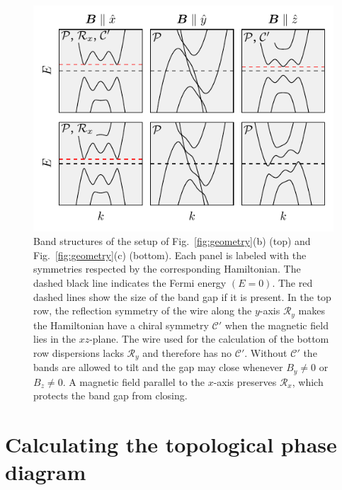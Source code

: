 \begin{figure}
\includegraphics[width=0.95\columnwidth]{chapter_orbitalfield/figures/bandstructure_annotated}
\caption{Band structures of the setup of Fig.~\ref{fig:geometry}(b) (top) and Fig.~\ref{fig:geometry}(c) (bottom).
Each panel is labeled with the symmetries respected by the corresponding Hamiltonian.
The dashed black line indicates the Fermi energy $(E=0)$.
The red dashed lines show the size of the band gap if it is present.
In the top row, the reflection symmetry of the wire along the $y$-axis $\mathcal{R}_y$ makes the Hamiltonian have a chiral symmetry $\mathcal{C}'$ when the magnetic field lies in the $xz$-plane.
The wire used for the calculation of the bottom row dispersions lacks $\mathcal{R}_y$ and therefore has no $\mathcal{C}'$.
Without $\mathcal{C}'$ the bands are allowed to tilt and the gap may close whenever $B_y \neq 0$ or $B_z \neq 0$.
A magnetic field parallel to the $x$-axis preserves $\mathcal{R}_x$, which protects the band gap from closing.\label{fig:bandstructure}}
\end{figure}

\section{Calculating the topological phase diagram}



